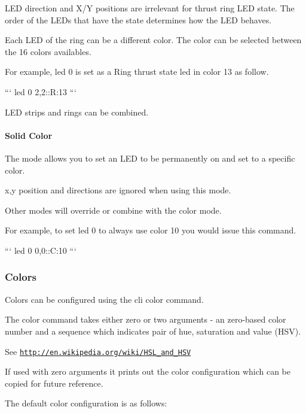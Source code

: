 L\+E\+D direction and X/\+Y positions are irrelevant for thrust ring L\+E\+D state. The order of the L\+E\+Ds that have the state determines how the L\+E\+D behaves.

Each L\+E\+D of the ring can be a different color. The color can be selected between the 16 colors availables.

For example, led 0 is set as a {\ttfamily R}ing thrust state led in color 13 as follow.

``` led 0 2,2\+::\+R\+:13 ```

L\+E\+D strips and rings can be combined.

\paragraph*{Solid Color}

The mode allows you to set an L\+E\+D to be permanently on and set to a specific color.

x,y position and directions are ignored when using this mode.

Other modes will override or combine with the color mode.

For example, to set led 0 to always use color 10 you would issue this command.

``` led 0 0,0\+::\+C\+:10 ```

\subsubsection*{Colors}

Colors can be configured using the cli {\ttfamily color} command.

The {\ttfamily color} command takes either zero or two arguments -\/ an zero-\/based color number and a sequence which indicates pair of hue, saturation and value (H\+S\+V).

See \href{http://en.wikipedia.org/wiki/HSL_and_HSV}{\tt http\+://en.\+wikipedia.\+org/wiki/\+H\+S\+L\+\_\+and\+\_\+\+H\+S\+V}

If used with zero arguments it prints out the color configuration which can be copied for future reference.

The default color configuration is as follows\+:

